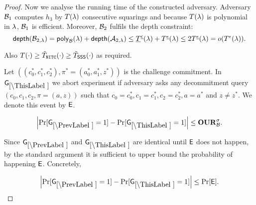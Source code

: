 \begin{proof}
Now we analyse the running time of the constructed adversary. Adversary $\mathcal{B}_1$ computes $h_3$ by $T(\lambda)$ consecutive squarings and because $T(\lambda)$ is polynomial in $\lambda$, $\mathcal{B}_1$ is efficient. Moreover, $\mathcal{B}_2$ fulfils the depth constraint:
\[ \mathsf{depth}(\mathcal{B}_{2,\lambda}) = \mathsf{poly}_{\mathcal{B}}(\lambda) + \mathsf{depth}(\mathcal{A}_{2,\lambda}) \leq \underline{T}^{\underline{\epsilon}}(\lambda) + T^{\underline{\epsilon}}(\lambda) \leq 2 T^{\underline{\epsilon}}(\lambda) = o(T^{\epsilon}(\lambda)). \] 

Also $T(\cdot) \geq \tilde{T}_{\mathtt{NITC}}(\cdot) \geq \tilde{T}_\mathsf{SSS}(\cdot)$ as required.  


Let $((c_0^*, c_1^*, c_2^*), \pi^*=(a_0^*,a_1^*,z^*))$ is the challenge commitment. In $\games_\thisgame$ we abort experiment if adversary asks any decommitment query $(c_0, c_1,c_2,\pi=(a,z))$ such that $c_0 = c_0^*, c_1 = c_1^*, c_2 = c_2^*, a = a^*$ and $z \neq z^*$. We denote this event by $\mathsf{E}$.
\begin{lemma}
\[
\left|\Pr[\games_\prevgame = 1] - \Pr[\games_\thisgame = 1]\right| \leq \qur^\sigma_\advB.
\]
\end{lemma}


Since $\games_\prevgame$ and $\games_\thisgame$ are identical until $\mathsf{E}$ does not happen, by the standard argument it is sufficient to upper bound the probability of happening $\mathsf{E}$. Concretely,  

\[
\left|\Pr[\games_\prevgame = 1] - \Pr[\games_\thisgame = 1]\right| \leq \Pr[\event]. 
\]


\end{proof}
